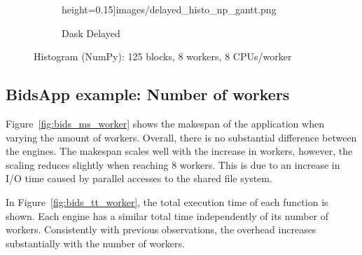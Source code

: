 \documentclass[conference]{IEEEtran}
\begin{document}
\begin{figure}[!tb]
\begin{subfigure}[b]{\columnwidth}
        height=0.15\textheight]{images/delayed_histo_np_gantt.png}%
        \caption{Dask Delayed}\label{fig:histo_np_dask_delayed_gantt}
    \end{subfigure}
    \caption{Histogram (NumPy): 125 blocks, 8 workers, 8
    CPUs/worker}\label{fig:histo_np_gantt}
\end{figure}

\subsection{BidsApp example: Number of workers}
Figure~\ref{fig:bids_ms_worker} shows the makespan of the application when
varying the amount of workers. Overall, there is no substantial difference
between the engines. The makespan scales well with the increase in workers,
however, the scaling reduces slightly when reaching 8 workers. This is due
to an increase in I/O time caused by parallel accesses to 
the shared file system.

In Figure~\ref{fig:bids_tt_worker}, the total execution time of each function is
shown. Each engine has a similar total time independently of its number of workers.
Consistently with previous observations, the overhead increases substantially with the 
number of workers.






\end{document}
